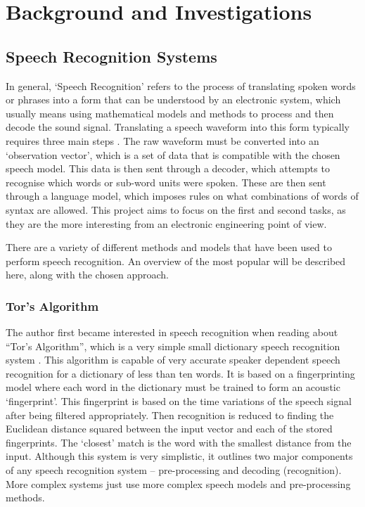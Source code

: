 \chapter{Background and Investigations} %
\label{cha:background}

\section{Speech Recognition Systems} %
\label{sec:speech_recognition_systems}
In general, `Speech Recognition' refers to the process of translating spoken words or phrases into a form that can be understood by an electronic system, which usually means using mathematical models and methods to process and then decode the sound signal.  Translating a speech waveform into this form typically requires three main steps \cite{melnikoff2003speech}.  The raw waveform must be converted into an `observation vector', which is a set of data that is compatible with the chosen speech model.  This data is then sent through a decoder, which attempts to recognise which words or sub-word units were spoken.  These are then sent through a language model, which imposes rules on what combinations of words of syntax are allowed.  This project aims to focus on the first and second tasks, as they are the more interesting from an electronic engineering point of view.

There are a variety of different methods and models that have been used to perform speech recognition.  An overview of the most popular will be described here, along with the chosen approach.

\subsection{Tor's Algorithm} %
\label{sub:tors_algorithm}
The author first became interested in speech recognition when reading about ``Tor's Algorithm'', which is a very simple small dictionary speech recognition system \cite{tor2003}.  This algorithm is capable of very accurate speaker dependent speech recognition for a dictionary of less than ten words.  It is based on a fingerprinting model where each word in the dictionary must be trained to form an acoustic `fingerprint'.  This fingerprint is based on the time variations of the speech signal after being filtered appropriately.  Then recognition is reduced to finding the Euclidean distance squared between the input vector and each of the stored fingerprints.  The `closest' match is the word with the smallest distance from the input.
Although this system is very simplistic, it outlines two major components of any speech recognition system -- pre-processing and decoding (recognition).  More complex systems just use more complex speech models and pre-processing methods.

